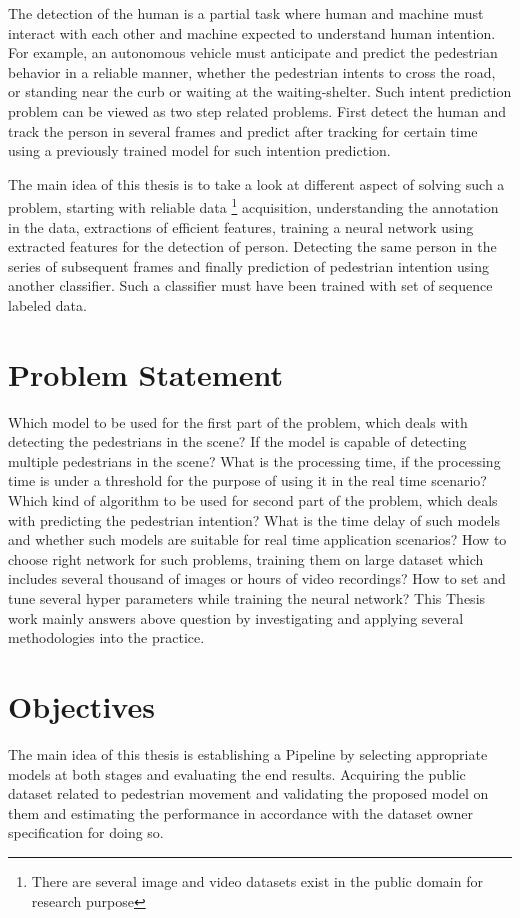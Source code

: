 \vspace{1em}
\noindent The detection of the human is a partial task where human and machine must interact 
with each other and machine expected to understand human intention. For example, 
an autonomous vehicle must anticipate and predict the pedestrian behavior in a reliable manner, whether 
the pedestrian intents to cross the road, or standing near the curb or waiting at the waiting-shelter.
Such intent prediction problem can be viewed as two step related problems. First detect the 
human and track the person in several frames and predict after tracking for certain time using a 
previously trained model for such intention prediction.

\vspace{1em}
\noindent The main idea of this thesis is to take a look at different aspect of solving such a problem, 
starting with reliable data \footnote{There are several image and video datasets exist in the 
public domain for research purpose} acquisition, understanding the annotation in the data, extractions of efficient features, training a neural network using extracted features for the detection of person. Detecting the same person in the series of subsequent frames and finally prediction of pedestrian intention using another classifier. Such a classifier must have been trained with set of sequence labeled data. 

\section{Problem Statement} 
Which model to be used for the first part of the problem, which deals with detecting the pedestrians in the scene? If the model is capable of detecting multiple pedestrians in the scene? What is the processing time, if the processing time is under a threshold for the purpose of using it in the real time scenario?
Which kind of algorithm to be used for second part of the problem, which deals with predicting the pedestrian intention? What is the time delay of such models and whether such models are suitable for real time application scenarios?
How to choose right network for such problems, training them on large dataset which includes several thousand of images or hours of video recordings? How to set and tune several hyper parameters while training the neural network? This Thesis work mainly answers above question by investigating and  applying several methodologies into the practice.

\section{Objectives}
The main idea of this thesis is establishing a Pipeline by selecting appropriate models at both stages and evaluating the end results. Acquiring the public dataset related to pedestrian movement and validating the proposed model on them and estimating the performance in accordance with the dataset owner specification for doing so.

